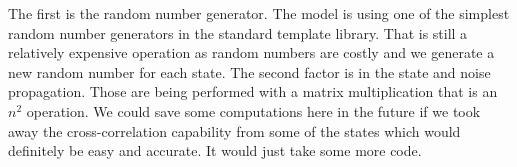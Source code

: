 The first is the random number generator.  The model is using 
one of the simplest random number generators in the standard template library.  
That is still a relatively expensive operation as random numbers are costly and 
we generate a new random number for each state.  The second factor is in the 
state and noise propagation.  Those are being performed with a matrix 
multiplication that is an $n^2$ operation.  We could save some computations 
here in the future if we took away the cross-correlation capability from some 
of the states which would definitely be easy and accurate.  It would just take 
some more code.
